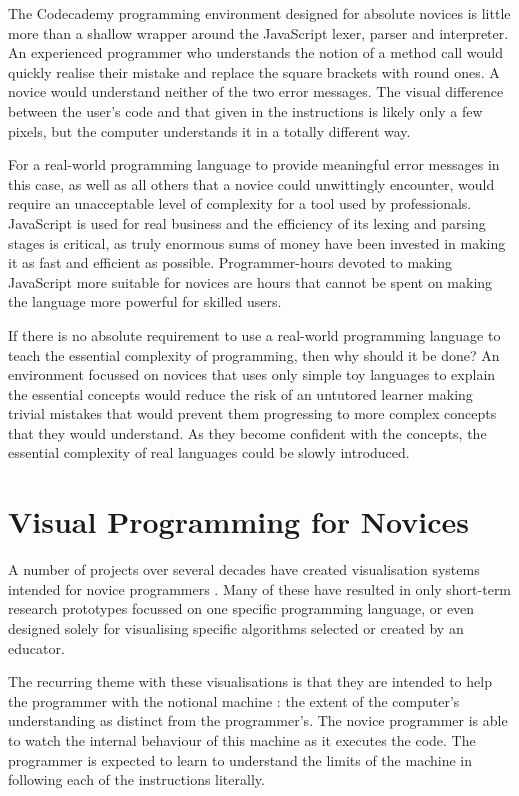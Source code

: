 The Codecademy programming environment designed for absolute novices is little more than a shallow wrapper around the JavaScript lexer, parser and interpreter. An experienced programmer who understands the notion of a method call would quickly realise their mistake and replace the square brackets with round ones. A novice would understand neither of the two error messages. The visual difference between the user's code and that given in the instructions is likely only a few pixels, but the computer understands it in a totally different way.

For a real-world programming language to provide meaningful error messages in this case, as well as all others that a novice could unwittingly encounter, would require an unacceptable level of complexity for a tool used by professionals. JavaScript is used for real business and the efficiency of its lexing and parsing stages is critical, as truly enormous sums of money have been invested in making it as fast and efficient as possible. Programmer-hours devoted to making JavaScript more suitable for novices are hours that cannot be spent on making the language more powerful for skilled users.

If there is no absolute requirement to use a real-world programming language to teach the essential complexity of programming, then why should it be done? An environment focussed on novices that uses only simple toy languages to explain the essential concepts would reduce the risk of an untutored learner making trivial mistakes that would prevent them progressing to more complex concepts that they would understand. As they become confident with the concepts, the essential complexity of real languages could be slowly introduced.

\section{Visual Programming for Novices}
A number of projects over several decades have created visualisation systems intended for novice programmers \cite{Sorva:2013:RGP:2543488.2490822}. Many of these have resulted in only short-term research prototypes focussed on one specific programming language, or even designed solely for visualising specific algorithms selected or created by an educator.

The recurring theme with these visualisations is that they are intended to help the programmer with the notional machine \cite{doi:10.2190/3LFX-9RRF-67T8-UVK9}: the extent of the computer's understanding as distinct from the programmer's. The novice programmer is able to watch the internal behaviour of this machine as it executes the code. The programmer is expected to learn to understand the limits of the machine in following each of the instructions literally. \cite{Sorva:2013:NMI:2483710.2483713}

